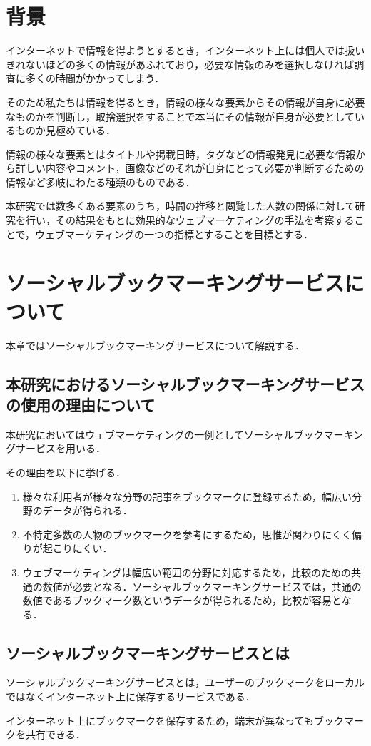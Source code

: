 \chapter{背景}
インターネットで情報を得ようとするとき，インターネット上には個人では扱いきれないほどの多くの情報があふれており，必要な情報のみを選択しなければ調査に多くの時間がかかってしまう．\par
そのため私たちは情報を得るとき，情報の様々な要素からその情報が自身に必要なものかを判断し，取捨選択をすることで本当にその情報が自身が必要としているものか見極めている．\par
情報の様々な要素とはタイトルや掲載日時，タグなどの情報発見に必要な情報から詳しい内容やコメント，画像などのそれが自身にとって必要か判断するための情報など多岐にわたる種類のものである．\par
本研究では数多くある要素のうち，時間の推移と閲覧した人数の関係に対して研究を行い，その結果をもとに効果的なウェブマーケティングの手法を考察することで，ウェブマーケティングの一つの指標とすることを目標とする．

\chapter{ソーシャルブックマーキングサービスについて}
本章ではソーシャルブックマーキングサービスについて解説する．

\section{本研究におけるソーシャルブックマーキングサービスの使用の理由について}
本研究においてはウェブマーケティングの一例としてソーシャルブックマーキングサービスを用いる．\par
その理由を以下に挙げる．

\begin{enumerate}
\item 様々な利用者が様々な分野の記事をブックマークに登録するため，幅広い分野のデータが得られる．
\item 不特定多数の人物のブックマークを参考にするため，思惟が関わりにくく偏りが起こりにくい．
\item ウェブマーケティングは幅広い範囲の分野に対応するため，比較のための共通の数値が必要となる．ソーシャルブックマーキングサービスでは，共通の数値であるブックマーク数というデータが得られるため，比較が容易となる．
\end{enumerate}

\newpage

\section{ソーシャルブックマーキングサービスとは}
ソーシャルブックマーキングサービスとは，ユーザーのブックマークをローカルではなくインターネット上に保存するサービスである．\par
インターネット上にブックマークを保存するため，端末が異なってもブックマークを共有できる．\par

